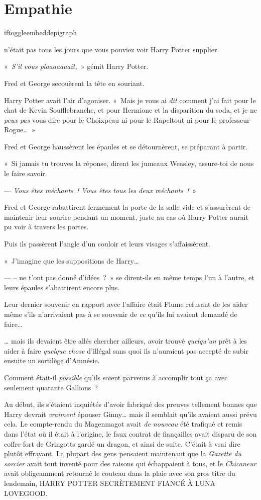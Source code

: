 \chapter{Empathie}

iftoggle{embeddepigraph}{}{}

 n'était pas tous les jours que vous pouviez voir Harry Potter supplier.

\hplettrineextrapara
«~\emph{S'il vous plaaaaaaaît,}~» gémit Harry Potter.

Fred et George secouèrent la tête en souriant.

Harry Potter avait l'air d'agoniser. «~Mais je vous ai \emph{dit} comment j'ai fait pour le chat de Kevin Soufflebranche, et pour Hermione et la disparition du soda, et je ne \emph{peux pas} vous dire pour le Choixpeau ni pour le Rapeltout ni pour le professeur Rogue…~»

Fred et George haussèrent les épaules et se détournèrent, se préparant à partir.

«~Si jamais tu trouves la réponse, dirent les jumeaux Weasley, assure-toi de nous le faire savoir.

--- \emph{Vous êtes méchants~! Vous êtes tous les deux méchants~!}~»

Fred et George rabattirent fermement la porte de la salle vide et s'assurèrent de maintenir leur sourire pendant un moment, juste au cas où Harry Potter aurait pu voir à travers les portes.

Puis ils passèrent l'angle d'un couloir et leurs visages s'affaissèrent.

«~J'imagine que les suppositions de Harry…

--- -- ne t'ont pas donné d'idées~?~» se dirent-ils en même temps l'un à l'autre, et leurs épaules s'abattirent encore plus.

Leur dernier souvenir en rapport avec l'affaire était Flume refusant de les aider même s'ils n'arrivaient pas à se souvenir de \emph{ce} qu'ils lui avaient demandé de faire…

… mais ils devaient être allés chercher ailleurs, avoir trouvé \emph{quelqu'un} prêt à les aider à faire \emph{quelque chose} d'illégal sans quoi ils n'auraient pas accepté de subir ensuite un sortilège d'Amnésie.

Comment était-il \emph{possible} qu'ils soient parvenus à accomplir tout ça avec seulement quarante Gallions~?

Au début, ils s'étaient inquiétés d'avoir fabriqué des preuves tellement bonnes que Harry devrait \emph{vraiment} épouser Ginny… mais il semblait qu'ils avaient aussi prévu cela. Le compte-rendu du Magenmagot avait \emph{de nouveau} été trafiqué et remis dans l'état où il était à l'origine, le faux contrat de fiançailles avait disparu de son coffre-fort de Gringotts gardé un dragon, et ainsi de suite. C'était à vrai dire plutôt effrayant. La plupart des gens pensaient maintenant que la \emph{Gazette du sorcier} avait tout inventé pour des raisons qui échappaient à tous, et le \emph{Chicaneur} avait obligeamment retourné le couteau dans la plaie avec son gros titre du lendemain, HARRY POTTER SECRÈTEMENT FIANCÉ À LUNA LOVEGOOD.

